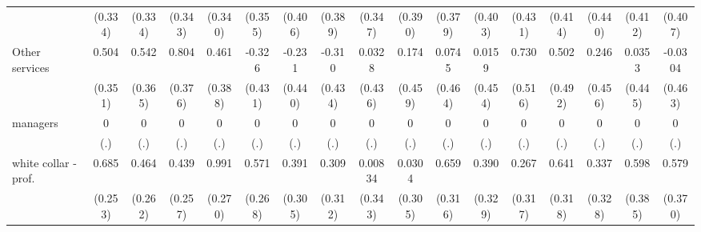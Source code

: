 {\begin{tabular}{l*{16}{c}}
                    &     (0.334)         &     (0.334)         &     (0.343)         &     (0.340)         &     (0.355)         &     (0.406)         &     (0.389)         &     (0.347)         &     (0.390)         &     (0.379)         &     (0.403)         &     (0.431)         &     (0.414)         &     (0.440)         &     (0.412)         &     (0.407)         \\
[1em]
Other services      &       0.504         &       0.542         &       0.804\sym{*}  &       0.461         &      -0.326         &      -0.231         &      -0.310         &      0.0328         &       0.174         &      0.0745         &      0.0159         &       0.730         &       0.502         &       0.246         &      0.0353         &     -0.0304         \\
                    &     (0.351)         &     (0.365)         &     (0.376)         &     (0.388)         &     (0.431)         &     (0.440)         &     (0.434)         &     (0.436)         &     (0.459)         &     (0.464)         &     (0.454)         &     (0.516)         &     (0.492)         &     (0.456)         &     (0.445)         &     (0.463)         \\
[1em]
managers            &           0         &           0         &           0         &           0         &           0         &           0         &           0         &           0         &           0         &           0         &           0         &           0         &           0         &           0         &           0         &           0         \\
                    &         (.)         &         (.)         &         (.)         &         (.)         &         (.)         &         (.)         &         (.)         &         (.)         &         (.)         &         (.)         &         (.)         &         (.)         &         (.)         &         (.)         &         (.)         &         (.)         \\
[1em]
white collar - prof.&       0.685\sym{**} &       0.464         &       0.439         &       0.991\sym{***}&       0.571\sym{*}  &       0.391         &       0.309         &     0.00834         &      0.0304         &       0.659\sym{*}  &       0.390         &       0.267         &       0.641\sym{*}  &       0.337         &       0.598         &       0.579         \\
                    &     (0.253)         &     (0.262)         &     (0.257)         &     (0.270)         &     (0.268)         &     (0.305)         &     (0.312)         &     (0.343)         &     (0.305)         &     (0.316)         &     (0.329)         &     (0.317)         &     (0.318)         &     (0.328)         &     (0.385)         &     (0.370)         \\

\end{tabular}}
